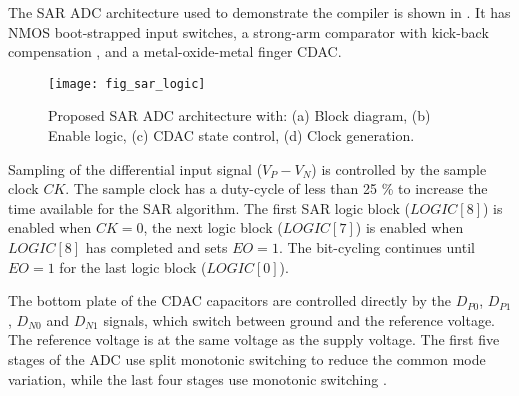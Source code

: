 The SAR ADC architecture used to demonstrate the compiler is shown in
.  It has NMOS
boot-strapped input switches, a strong-arm comparator with kick-back compensation
\cite{varzaghani13}, and a metal-oxide-metal finger CDAC.

\begin{figure*}[t]
\centerline{\texttt{[image: fig\_sar\_logic]}}
\caption{Proposed SAR ADC architecture with: (a) Block diagram, (b) Enable
  logic, (c) CDAC state control, (d) Clock generation.}
\label{fig_sar}
\end{figure*}


Sampling of the differential input signal ($V_P - V_N$) is
controlled by the sample clock $CK$. The sample clock has a
duty-cycle of less than 25 \% to increase the time available for the
SAR algorithm. The first SAR logic block
($LOGIC[8]$) is enabled when $CK=0$, the next logic block ($LOGIC[7]$) is
enabled when $LOGIC[8]$ has completed and sets $EO=1$. The bit-cycling continues until $EO=1$ for the last logic block
($LOGIC[0]$).


The bottom plate of the CDAC capacitors
are controlled directly by the $D_{P0}$, $D_{P1}$, $D_{N0}$ and
$D_{N1}$ signals, which switch between ground and the reference
voltage. The reference voltage is at the same voltage as the supply
voltage. The
first five stages of the ADC use split monotonic switching \cite{liu10a} to reduce the common
mode variation, while the last four stages use monotonic switching
\cite{liu10}.


